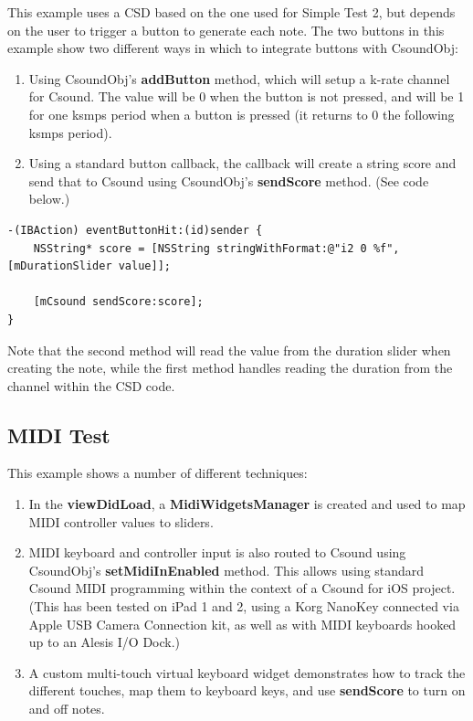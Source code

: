 \documentclass[11pt]{article}
\begin{document}
This example uses a CSD based on the one used for Simple Test 2, but depends on the user to trigger a button to generate each note.  The two buttons in this example show two different ways in which to integrate buttons with CsoundObj:

\begin{enumerate}
\item Using CsoundObj's \textbf{addButton} method, which will setup a k-rate channel for Csound.  The value will be 0 when the button is not pressed, and will be 1 for one ksmps period when a button is pressed (it returns to 0 the following ksmps period). 
\item Using a standard button callback, the callback will create a string score and send that to Csound using CsoundObj's \textbf{sendScore} method. (See code below.)
\end{enumerate}


\begin{lstlisting}[caption=Example code showing sending score text to CsoundObj]
-(IBAction) eventButtonHit:(id)sender {
    NSString* score = [NSString stringWithFormat:@"i2 0 %f", [mDurationSlider value]];

    [mCsound sendScore:score];
}
\end{lstlisting}

Note that the second method will read the value from the duration slider when creating the note, while the first method handles reading the duration from the channel within the CSD code. 

\subsection{MIDI Test}

This example shows a number of different techniques:

\begin{enumerate}
\item In the \textbf{viewDidLoad}, a \textbf{MidiWidgetsManager} is created and used to map MIDI controller values to sliders.
\item MIDI keyboard and controller input is also routed to Csound using CsoundObj's \textbf{setMidiInEnabled} method. This allows using standard Csound MIDI programming within the context of a Csound for iOS project. (This has been tested on iPad 1 and 2, using a Korg NanoKey connected via Apple USB Camera Connection kit, as well as with MIDI keyboards hooked up to an Alesis I/O Dock.) 
\item A custom multi-touch virtual keyboard widget demonstrates how to track the different touches, map them to keyboard keys, and use \textbf{sendScore} to turn on and off notes. 
\end{enumerate}
\end{document}
